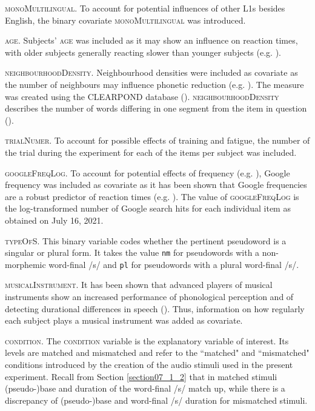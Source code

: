 \textsc{monoMultilingual}. To account for potential influences of other L1s besides English, the binary covariate \textsc{monoMultilingual} was introduced. 

\textsc{age}. Subjects’ \textsc{age} was included as it may show an influence on reaction times, with older subjects generally reacting slower than younger subjects (e.g. \cite{Fozard1994}).

\textsc{neighbourhoodDensity}. Neighbourhood densities were included as covariate as the number of neighbours may influence phonetic reduction (e.g. \cite{Gahl2012}). The measure was created using the CLEARPOND database (\cite{Marian2012}). \textsc{neighbourhoodDensity} describes the number of words differing in one segment from the item in question (\cite[3]{Marian2012}).

\textsc{trialNumer}. To account for possible effects of training and fatigue, the number of the trial during the experiment for each of the items per subject was included. 

\textsc{googleFreqLog}. To account for potential effects of frequency (e.g. \cite{Baayen2006, Keuleers2010, Brysbaert2011}), Google frequency was included as covariate as it has been shown that Google frequencies are a robust predictor of reaction times (e.g. \cite{Hendrix2020}). The value of \textsc{googleFreqLog} is the log-transformed number of Google search hits for each individual item as obtained on July 16, 2021.

\textsc{typeOfS}. This binary variable codes whether the pertinent pseudoword is a singular or plural form. It takes the value \texttt{nm} for pseudowords with a non-morphemic word-final /s/ and \texttt{pl} for pseudowords with a plural word-final /s/.

\textsc{musicalInstrument}. It has been shown that advanced players of musical instruments show an increased performance of phonological perception and of detecting durational differences in speech (\cite{Anvari2002, Milovanov2009}). Thus, information on how regularly each subject plays a musical instrument was added as covariate.

\textsc{condition}. The \textsc{condition} variable is the explanatory variable of interest. Its levels are matched and mismatched and refer to the ``matched" and ``mismatched" conditions introduced by the creation of the audio stimuli used in the present experiment. Recall from Section \ref{section07_1_2} that in matched stimuli (pseudo-)base and duration of the word-final /s/ match up, while there is a discrepancy of (pseudo-)base and word-final /s/ duration for mismatched stimuli. 

